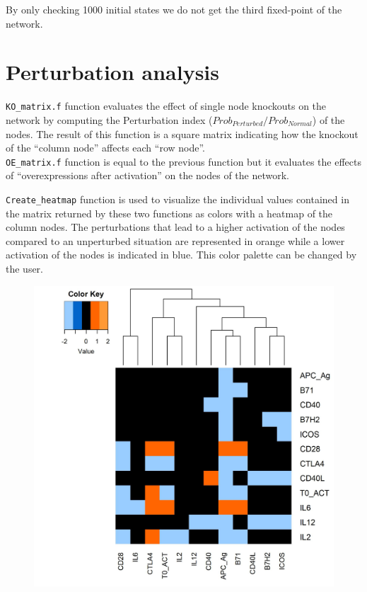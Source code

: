 \documentclass[a4paper]{article}
\begin{document}
By only checking 1000 initial states we do not get the third fixed-point of the network.
\section{Perturbation analysis}
\texttt{KO\_matrix.f} function evaluates the effect of single node knockouts on the network by computing the Perturbation index ($Prob_{Perturbed} / Prob_{Normal}$) of the nodes. The result of this function is a square matrix indicating how the knockout of the ``column node'' affects each ``row node''.\\
\texttt{OE\_matrix.f} function is equal to the previous function but it evaluates the effects of ``overexpressions after activation'' on the nodes of the network.

\texttt{Create\_heatmap} function is used to visualize the individual values contained in the matrix returned by these two functions as colors with a heatmap of the column nodes. The perturbations that lead to a higher activation of the nodes compared to an unperturbed situation are represented in orange while a lower activation of the nodes is indicated in blue. This color palette can be changed by the user.


\begin{Schunk}
\end{Schunk}
\begin{figure}[!htbp]
\centerline{\includegraphics{heatmap.jpg}}
\end{figure}
\end{document}
